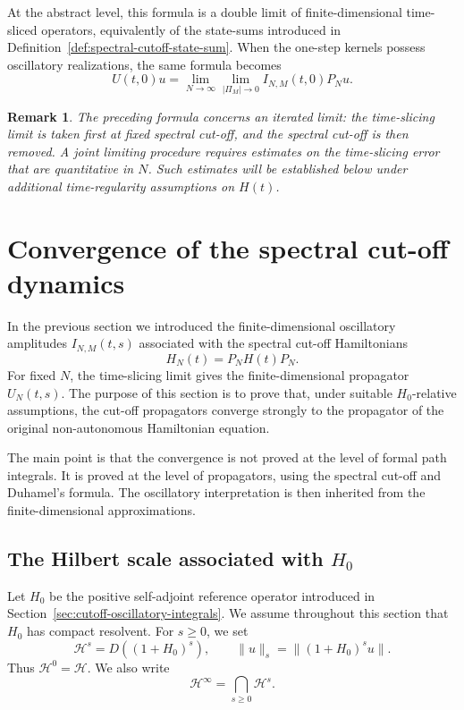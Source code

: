 \documentclass[10pt,a4paper]{amsart}
\newtheorem{remark}[theorem]{Remark}
\newcommand{\Hilb}{\mathcal H}
\begin{document}
At the abstract level, this formula is a double limit of finite-dimensional
time-sliced operators, equivalently of the state-sums introduced in
Definition~\ref{def:spectral-cutoff-state-sum}. When the one-step kernels
possess oscillatory realizations, the same formula becomes
\[
U(t,0)u
=
\lim_{N\to\infty}
\lim_{|\Pi_{M}|\to 0}
I_{N,M}(t,0)P_{N}u.
\]

\begin{remark}
\label{rem:iterated-versus-joint-limit}
The preceding formula concerns an iterated limit: the time-slicing limit is
taken first at fixed spectral cut-off, and the spectral cut-off is then
removed. A joint limiting procedure requires estimates on the time-slicing
error that are quantitative in \(N\). Such estimates will be established
below under additional time-regularity assumptions on \(H(t)\).
\end{remark}
\section{Convergence of the spectral cut-off dynamics}
\label{sec:convergence-cutoff-dynamics}

In the previous section we introduced the finite-dimensional
oscillatory amplitudes \(I_{N,M}(t,s)\) associated with the spectral
cut-off Hamiltonians
\[
        H_N(t)=P_NH(t)P_N.
\]
For fixed \(N\), the time-slicing limit gives the finite-dimensional
propagator \(U_N(t,s)\).  The purpose of this section is to prove that,
under suitable \(H_0\)-relative assumptions, the cut-off propagators
converge strongly to the propagator of the original non-autonomous
Hamiltonian equation.

The main point is that the convergence is not proved at the level of
formal path integrals.  It is proved at the level of propagators, using
the spectral cut-off and Duhamel's formula.  The oscillatory
interpretation is then inherited from the finite-dimensional
approximations.

\subsection{The Hilbert scale associated with \(H_0\)}

Let \(H_0\) be the positive self-adjoint reference operator introduced
in Section~\ref{sec:cutoff-oscillatory-integrals}.  We assume throughout
this section that \(H_0\) has compact resolvent.  For \(s\geq0\), we set
\[
        \Hilb^s=D((1+H_0)^s),
        \qquad
        \|u\|_s=\|(1+H_0)^s u\|.
\]
Thus \(\Hilb^0=\Hilb\).  We also write
\[
        \Hilb^\infty=\bigcap_{s\geq0}\Hilb^s.
\]
\end{document}

